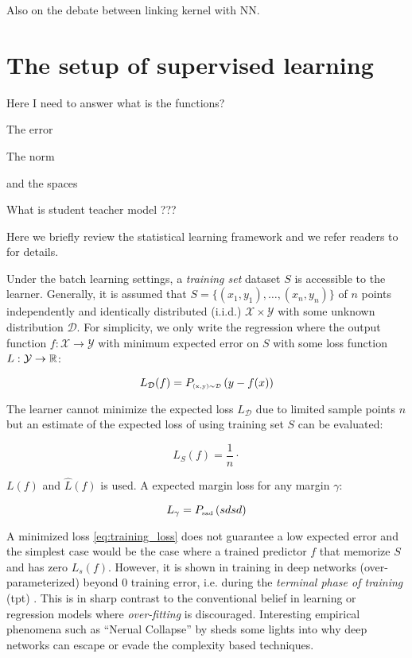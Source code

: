 Also on the debate between linking kernel with NN.


\section{The setup of supervised learning}

Here I need to answer what is the functions?

The error

The norm

and the spaces

What is student teacher model ???

Here we briefly review the statistical learning framework and we refer readers to \cite{shalev-shwartzUnderstandingMachineLearning2014a} for details.

Under the batch learning settings, a \textit{training set} dataset $S$ is
accessible to the learner. Generally, it is assumed that $S = \{(x_1,y_1),
\dots, (x_n, y_n)\}$ of $n$ points independently and identically distributed
(i.i.d.) $\mathcal{X} \times \mathcal{Y}$ with some unknown distribution
$\mathcal{D}$. For simplicity, we only write the regression where the output
function $f: \mathcal{X} \to \mathcal{Y}$ with minimum expected error on $S$
with some loss function $L: \mathcal{Y} \to \mathbb{R}$:

\begin{equation}
    \label{eq:training_loss}
    L_{\mathcal{D}}(f) = \PRi{(x, y) \sim \mathcal{D}}{y - f(x)}
\end{equation}

The learner cannot minimize the expected loss $L_{\mathcal{D}}$ due to limited
sample points $n$ but an estimate of the expected loss of using training set $S$
can be evaluated:

\begin{equation}
    L_{S}(f) = \frac{1}{n} \cdot
\end{equation}

$L(f)$ and $\hat{L}(f)$ is used. A expected margin loss for any margin $\gamma$:

\begin{equation}
    L_{\gamma} = \PRi{sad}{sdsd}
\end{equation}


A minimized loss \eqref{eq:training_loss} does not guarantee a low expected
error and the simplest case would be the case where a trained predictor $f$ that
memorize $S$ and has zero $L_{s}(f)$. However, it is shown in  training in deep networks (over-parameterized) beyond $0$ training
error, i.e. during the \textit{terminal phase of training} (\Gls{tpt}) \TOCITE.
This is in sharp contrast to the conventional belief in learning or regression
models where \textit{over-fitting} is discouraged. Interesting empirical
phenomena such as ``Nerual Collapse'' by \TOCITE sheds some lights into why deep
networks can escape or evade the complexity based techniques.

